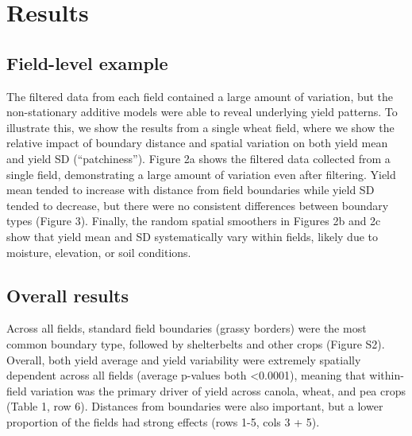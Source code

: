 \documentclass[]{elsarticle} %
\begin{document}
\hypertarget{results}{%
\section{Results}\label{results}}

\hypertarget{field-level-example}{%
\subsection{Field-level example}\label{field-level-example}}

The filtered data from each field contained a large amount of variation, but the non-stationary additive models were able to reveal underlying yield patterns.
To illustrate this, we show the results from a single wheat field, where we show the relative impact of boundary distance and spatial variation on both yield mean and yield SD (``patchiness'').
Figure 2a shows the filtered data collected from a single field, demonstrating a large amount of variation even after filtering.
Yield mean tended to increase with distance from field boundaries while yield SD tended to decrease, but there were no consistent differences between boundary types (Figure 3).
Finally, the random spatial smoothers in Figures 2b and 2c show that yield mean and SD systematically vary within fields, likely due to moisture, elevation, or soil conditions.

\hypertarget{overall-results}{%
\subsection{Overall results}\label{overall-results}}

Across all fields, standard field boundaries (grassy borders) were the most common boundary type, followed by shelterbelts and other crops (Figure S2).
Overall, both yield average and yield variability were extremely spatially dependent across all fields (average p-values both \textless0.0001), meaning that within-field variation was the primary driver of yield across canola, wheat, and pea crops (Table 1, row 6).
Distances from boundaries were also important, but a lower proportion of the fields had strong effects (rows 1-5, cols 3 + 5).
\end{document}
